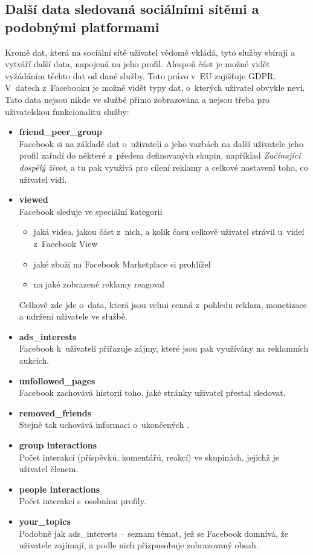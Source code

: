 \subsection{Další data sledovaná sociálními sítěmi a podobnými platformami}
Kromě dat, která na sociální sítě uživatel vědomě vkládá, tyto služby sbírají a vytváří další data, napojená na jeho profil. Alespoň část je možné vidět vyžádáním těchto dat od dané služby. Toto právo v~EU zajišťuje GDPR.\\
V~datech z~Facebooku je možné vidět typy dat, o~kterých uživatel obvykle neví. Tato data nejsou nikde ve službě přímo zobrazována a nejsou třeba pro uživatelskou funkcionalitu služby:
\begin{itemize}
	\item \textbf{friend\_peer\_group}\\
	Facebook si na základě dat o~uživateli a jeho vazbách na další uživatele jeho profil zařadí do některé z~předem definovaných skupin, například \textit{Začínající dospělý život}, a tu pak využívá pro cílení reklamy a celkové nastavení toho, co uživatel vidí.
	
	\item \textbf{viewed}\\
	Facebook sleduje ve speciální kategorii
	\begin{itemize}
		\item jaká videa, jakou část z~nich, a kolik času celkově uživatel strávil u~videí z~Facebook View
		\item jaké zboží na Facebook Marketplace si prohlížel
		\item na jaké zobrazené reklamy reagoval
	\end{itemize}
	Celkově zde jde o~data, která jsou velmi cenná z~pohledu reklam, monetizace a udržení uživatele ve službě.
	
	\item \textbf{ads\_interests}\\
	Facebook k~uživateli přiřazuje zájmy, které jsou pak využívány na reklamních aukcích.

	\item \textbf{unfollowed\_pages}\\
	Facebook zachovává historii toho, jaké stránky uživatel přestal sledovat.

	\item \textbf{removed\_friends}\\
	Stejně tak uchovává informaci o~ukončených .

	\item \textbf{group interactions}\\
	Počet interakcí (příspěvků, komentářů, reakcí) ve skupinách, jejichž je uživatel členem.

	\item \textbf{people interactions}\\
	Počet interakcí s~osobními profily.

	\item \textbf{your\_topics}\\
	Podobně jak ads\_interests -- seznam témat, jež se Facebook domnívá, že uživatele zajímají, a podle nich přizpusobuje zobrazovaný obsah.
\end{itemize}

